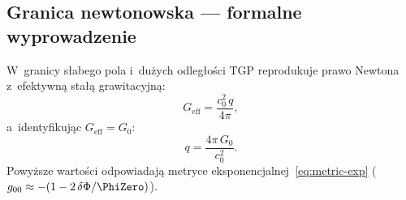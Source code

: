 \subsection{Granica newtonowska --- formalne
  wyprowadzenie}\label{ssec:newton-formal}

\begin{theorem}\label{thm:newton}
W~granicy s\l{}abego pola i~du\.zych odleg\l{}o\'sci TGP reprodukuje
prawo Newtona z~efektywn\k{a} sta\l{}\k{a} grawitacyjn\k{a}:
\begin{equation}\label{eq:Geff-from-q}
  \boxed{
    G_{\mathrm{eff}}
    = \frac{c_0^2\,q}{4\pi},
  }
\end{equation}
a~identyfikuj\k{a}c $G_{\mathrm{eff}} = G_0$:
\begin{equation}\label{eq:q-from-G}
  q = \frac{4\pi\,G_0}{c_0^2}.
\end{equation}
Powy\.zsze warto\'sci odpowiadaj\k{a} metryce
eksponencjalnej~\eqref{eq:metric-exp}
($g_{00} \approx -(1 - 2\,\delta\Phi/\PhiZero)$).
\end{theorem}

